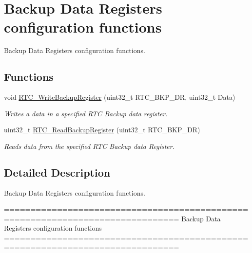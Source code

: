 \hypertarget{group___r_t_c___group10}{\section{Backup Data Registers configuration functions}
\label{group___r_t_c___group10}
}


Backup Data Registers configuration functions.  


\subsection*{Functions}
\begin{DoxyCompactItemize}
\item 
void \hyperlink{group___r_t_c___group10_gaa1241e2b47d04acc116b50d7b031c3aa}{R\-T\-C\-\_\-\-Write\-Backup\-Register} (uint32\-\_\-t R\-T\-C\-\_\-\-B\-K\-P\-\_\-\-D\-R, uint32\-\_\-t Data)
\begin{DoxyCompactList}\small\item\em Writes a data in a specified R\-T\-C Backup data register. \end{DoxyCompactList}\item 
uint32\-\_\-t \hyperlink{group___r_t_c___group10_ga504489fd91a66e392beb82bb8230b37f}{R\-T\-C\-\_\-\-Read\-Backup\-Register} (uint32\-\_\-t R\-T\-C\-\_\-\-B\-K\-P\-\_\-\-D\-R)
\begin{DoxyCompactList}\small\item\em Reads data from the specified R\-T\-C Backup data Register. \end{DoxyCompactList}\end{DoxyCompactItemize}


\subsection{Detailed Description}
Backup Data Registers configuration functions. \begin{DoxyVerb} ===============================================================================
                       Backup Data Registers configuration functions 
 ===============================================================================  \end{DoxyVerb}
 

